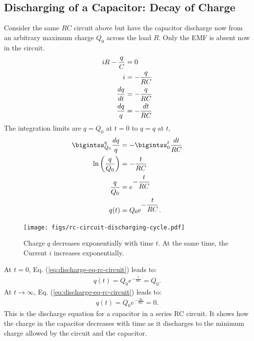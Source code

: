 \documentclass[12pt,b4paper]{article}
\begin{document}
\subsection{Discharging of a Capacitor: Decay of Charge}
Consider the same $RC$ circuit above but have the capacitor discharge now from an arbitrary maximum charge $Q_0$ across the load $R$. Only the EMF is absent now in the circuit.
\begin{align}
    iR-\frac{q}{C}&=0\notag\\
    i&=-\frac{q}{RC}\\
    \frac{dq}{dt}&=-\frac{q}{RC}\notag\\
    \frac{dq}{q}&=-\frac{dt}{RC}\notag
\end{align}
The integration limits are $q=Q_0$ at $t=0$ to $q=q$ at $t$,
\begin{align}
    \bigintss_{Q_0}^{q}\frac{dq}{q}&=-\bigintss_{0}^{t}\frac{dt}{RC}\notag\\
    \ln\left(\frac{q}{Q_0}\right)&=-\frac{t}{RC}\notag\\
    \frac{q}{Q_0}&=e^{\displaystyle-\frac{t}{RC}}\notag\\
    q(t)&=Q_0e^{\displaystyle-\frac{t}{RC}}.\label{eq:discharge-eq-rc-circuit}
\end{align}
\begin{figure}
    \centering
    \texttt{[image: figs/rc-circuit-discharging-cycle.pdf]}
    \caption{Charge $q$ decreases exponentially with time $t$. At the same time, the Current $i$ increases exponentially.}
    \label{fig:rc-discharging-cycle}
\end{figure}
At $t=0$, Eq. (\ref{eq:discharge-eq-rc-circuit}) leads to:
\begin{align*}
    q(t)=Q_0e^{\displaystyle-\frac{t}{RC}}=Q_0.
\end{align*}
At $t\to\infty$, Eq. (\ref{eq:discharge-eq-rc-circuit}) leads to:
\begin{align*}
    q(t)=Q_0e^{\displaystyle-\frac{\infty}{RC}}=0.
\end{align*}
This is the discharge equation for a capacitor in a series RC circuit. It shows how the charge in the capacitor decreases with time as it discharges to the minimum charge allowed by the circuit and the capacitor.
\end{document}
